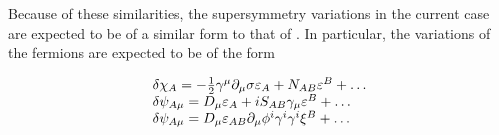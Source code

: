 \documentclass{article}
\begin{document}
Because of these similarities, the supersymmetry variations in the current case are expected
to be of a similar form to that of . In particular, the variations of the fermions are expected
to be of the form


\begin{equation}
\begin{array}{l l}{{\delta\chi_{A}=-\frac{1}{2}\gamma^{\mu}\partial_{\mu}\sigma\varepsilon_{A}+N_{A B}\varepsilon^{B}+\ldots}}\\ {{\delta\psi_{A\mu}=D_{\mu}\varepsilon_{A}+i S_{A B}\gamma_{\mu}\varepsilon^{B}+\ldots}}\\ {{\delta\psi_{A\mu}=D_{\mu}\varepsilon_{A B}\partial_{\mu}\phi^{i}\gamma^{i}\gamma^{i}\xi^{B}+\ldots}}\end{array}
\end{equation}
\end{document}
